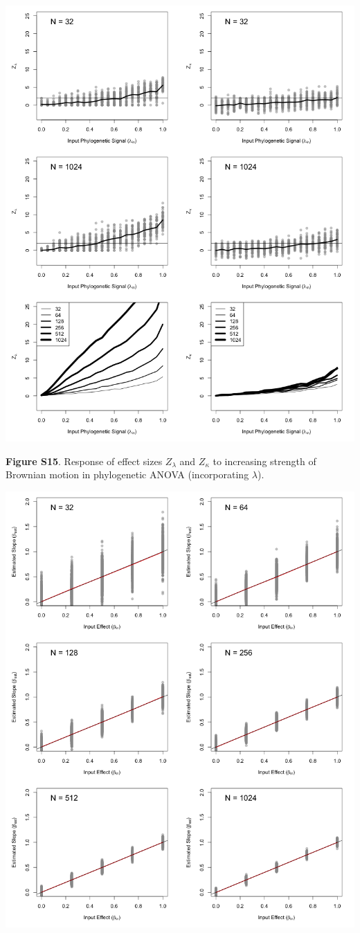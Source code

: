 \documentclass[
]{article}
\begin{document}
\includegraphics[width=0.95\linewidth]{fig.S15}

\textbf{Figure S15}. Response of effect sizes \(Z_{\lambda}\) and
\(Z_{\kappa}\) to increasing strength of Brownian motion in phylogenetic
ANOVA (incorporating \(\lambda\)).

\includegraphics[width=0.95\linewidth]{fig.S16}
\end{document}
